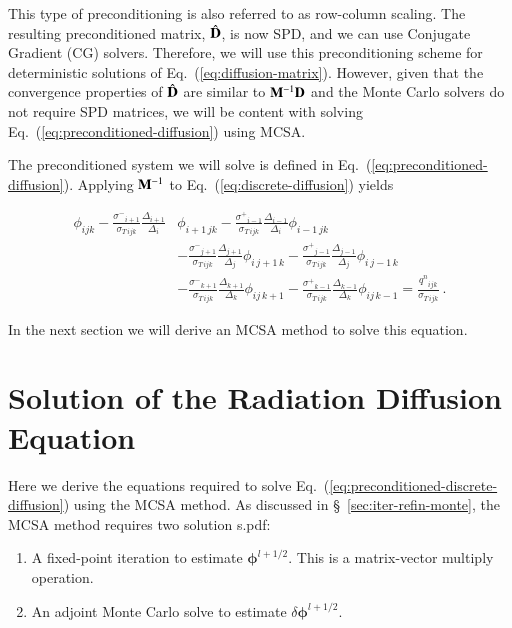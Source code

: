 \documentclass[preprint,12pt]{elsarticle}
\newcommand{\qn}{\ensuremath{q^n}}
\newcommand{\Di}{\ensuremath{\Delta_i}}
\newcommand{\Dj}{\ensuremath{\Delta_j}}
\newcommand{\Dk}{\ensuremath{\Delta_k}}
\newcommand{\sigT}{\ensuremath{\sigma_{T\,ijk}}}
\newcommand{\sigm}{\ensuremath{\sigma^{-}}}
\newcommand{\sigp}{\ensuremath{\sigma^{+}}}
\newcommand{\bphi}{\ensuremath{\boldsymbol{\phi}}}
\begin{document}
This type of preconditioning is also referred to as row-column
scaling.  The resulting preconditioned matrix, $\hat{\mathbf{D}}$, is now
SPD, and we can use Conjugate Gradient (CG) solvers.  Therefore, we
will use this preconditioning scheme for deterministic solutions of
Eq.~(\ref{eq:diffusion-matrix}).  However, given that the convergence
properties of $\hat{\mathbf{D}}$ are similar to $\mathbf{M}^{-1}\mathbf{D}$ and
the Monte Carlo solvers do not require SPD matrices, we will be
content with solving Eq.~(\ref{eq:preconditioned-diffusion}) using
MCSA.

The preconditioned system we will solve is defined in
Eq.~(\ref{eq:preconditioned-diffusion}).  Applying $\mathbf{M}^{-1}$ to
Eq.~(\ref{eq:discrete-diffusion}) yields

\begin{equation}
  \begin{aligned}
    \phi_{ijk} 
    - \frac{\sigm_{i+1}}{\sigT}\frac{\Delta_{i+1}}{\Di}&\phi_{i+1\,jk}
    - \frac{\sigp_{i-1}}{\sigT}\frac{\Delta_{i-1}}{\Di}\phi_{i-1\,jk}\\
    &- \frac{\sigm_{j+1}}{\sigT}\frac{\Delta_{j+1}}{\Dj}\phi_{i\,j+1\,k}
    -\frac{\sigp_{j-1}}{\sigT}\frac{\Delta_{j-1}}{\Dj}\phi_{i\,j-1\,k}\\
    &- \frac{\sigm_{k+1}}{\sigT}\frac{\Delta_{k+1}}{\Dk}\phi_{ij\,k+1}
    - \frac{\sigp_{k-1}}{\sigT}\frac{\Delta_{k-1}}{\Dk}\phi_{ij\,k-1}
    = \frac{\qn_{ijk}}{\sigT}\:.
  \end{aligned}
  \label{eq:preconditioned-discrete-diffusion}
\end{equation}

In the next section we will derive an MCSA method to solve this
equation.

\section{Solution of the Radiation Diffusion Equation}
\label{sec:solut-radi-diff}

Here we derive the equations required to solve
Eq.~(\ref{eq:preconditioned-discrete-diffusion}) using the MCSA
method.  As discussed in \S~\ref{sec:iter-refin-monte}, the MCSA
method requires two solution s.pdf:

\begin{enumerate}
\item A fixed-point iteration to estimate $\bphi^{l+1/2}$.  This is a
  matrix-vector multiply operation.
\item An adjoint Monte Carlo solve to estimate $\delta\bphi^{l+1/2}$.
\end{enumerate}
\end{document}
